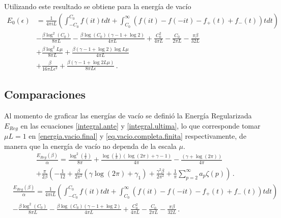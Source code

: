 Utilizando este resultado se obtiene para la energía de vacío
\begin{align}
\label{eq.vacio.completa.finita}
\nonumber
	E _0 (\epsilon )&=  
		\frac{1}{4 \pi i L} 
		\left(
			\int _{-C _0} ^{C _0} f (i t) t dt
			+ \int _{C _0} ^{\infty}  \left( f(i t) - f(-i t) - f _{+} (t) + f _{-} (t) \right) t dt
			\right) 
\\ \nonumber &
	- \frac{\beta \log ^2 (C _0) }{8 \pi L}
	-\frac{\beta \log (C _0) (\gamma -1 + \log 2  )}{4 \pi L}
	+ \frac{C _0 ^2}{4 \pi L}
	- \frac{C _0}{2 \pi L}
	- \frac{\pi \beta}{32 L}
\\ \nonumber &
	+ \frac{\beta \log ^2 L \mu}{8 \pi L}
	+ \frac{\beta (\gamma -1 + \log 2  )  \log L \mu}{4 \pi L}
\\ &
	+ \frac{\beta}{16 \pi L \epsilon ^2}
	+ \frac{\beta (\gamma -1 + \log 2 L \mu )}{8  \pi L \epsilon }
	\, .
\end{align}


\subsection{Comparaciones}

Al momento de graficar las energías de vacío se definió la Energía Regularizada $E _{Reg}$ en las ecuaciones \eqref{integral.ante} y \eqref{integral.ultima}, lo que corresponde tomar $\mu L = 1$ en     \eqref{energia.vacio.final} y \eqref{eq.vacio.completa.finita} respectivamente, de manera que la energía de vacío no dependa de la escala $\mu$.
\begin{align}
\nonumber
&
	\frac{E_ {Reg} ( \beta )}{\alpha}  =
	\frac{ \log ^2 \left( \frac{ 1 }{\pi} \right)}{8 \pi}  +
		\frac{ 
			 \log \left( \frac{ 1 }{\pi}\right)
				( \log (2 \pi ) + \gamma -1 )}  
			{4 \pi }  
	- \frac{ (\gamma + \log (2 \pi ) )}{4 \pi}
\\[5pt]
&
+
	\frac{\pi}{2 \beta}  
			\left(
				- \frac{1}{12} +
				\frac{\beta}{2 \pi ^2} 
				\left(
					\gamma \log (2 \pi)
					+ \gamma _1
					\right) +
								\frac{\gamma ^2 \beta }{2 \pi ^2} +
								\frac{1}{\pi} \sum _{p=2} ^{\infty}
								a_p \zeta (p) 
							\right) 
\, .
\label{integral.ante}
\end{align}
\begin{align}
\nonumber
&
	\frac{E _{Reg} ( \beta ) }{\alpha} =  
		\frac{1}{4 \pi i L} 
		\left(
			\int _{-C _0} ^{C _0} f (i t) t dt
			+ \int _{C _0} ^{\infty}  \left( f(i t) - f(-i t) - f _{+} (t) + f _{-} (t) \right) t dt
			\right) 
\\  &
	- \frac{\beta \log ^2 (C _0) }{8 \pi L}
	-\frac{\beta \log (C _0) (\gamma -1 + \log 2  )}{4 \pi L}
	+ \frac{C _0 ^2}{4 \pi L}
	- \frac{C _0}{2 \pi L}
	- \frac{\pi \beta}{32 L}
	\, .
\label{integral.ultima}
\end{align}

